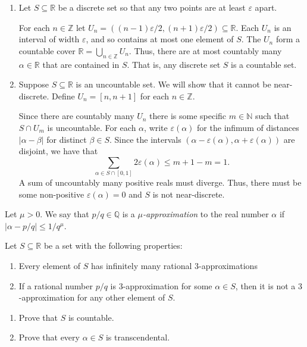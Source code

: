 \documentclass[12 pt, letterpaper]{hmcpset}
\begin{document}
\begin{solution}
	\begin{enumerate}
		\item Let $S \subseteq \mathbb{R}$ be a discrete set so that any two points are at least $\varepsilon$ apart.

			For each $n \in \mathbb{Z}$ let $U_{n} = ((n - 1) \varepsilon / 2, (n + 1) \varepsilon / 2) \subseteq \mathbb{R}$. Each $U_{n}$ is an interval of width $\varepsilon$, and so contains at most one element of $S$. The $U_{n}$ form a countable cover $\mathbb{R} = \bigcup_{n \in \mathbb{Z}} U_{n}$. Thus, there are at most countably many $\alpha \in \mathbb{R}$ that are contained in $S$. That is, any discrete set $S$ is a countable set.

		\item Suppose $S \subseteq \mathbb{R}$ is an uncountable set. We will show that it cannot be near-discrete. Define $U_{n} = [n, n + 1]$ for each $n \in \mathbb{Z}$.

			Since there are countably many $U_{n}$ there is some specific $m \in \mathbb{N}$ such that $S \cap U_{m}$ is uncountable. For each $\alpha$, write $\varepsilon(\alpha)$ for the infimum of distances $\lvert \alpha - \beta \rvert$ for distinct $\beta \in S$. Since the intervals $(\alpha - \varepsilon(\alpha), \alpha + \varepsilon(\alpha))$ are disjoint, we have that
			\[
				\sum_{\alpha \in S \cap [0, 1]} 2 \varepsilon(\alpha) \le m + 1 - m = 1.
			\]
			A sum of uncountably many positive reals must diverge. Thus, there must be some non-positive $\varepsilon(\alpha) = 0$ and $S$ is not near-discrete.
	\end{enumerate}
\end{solution}

\pagebreak

\begin{problem}[Problem 4.]
	Let $\mu > 0$. We say that $p / q \in \mathbb{Q}$ is a \emph{$\mu$-approximation} to the real number $\alpha$ if $\left \lvert \alpha - p/q \right \rvert \le 1 / q^{\mu}.$ 

	Let $S \subseteq \mathbb{R}$ be a set with the following properties:
	\begin{enumerate}[label = (\arabic*)]
		\item Every element of $S$ has infinitely many rational $3$-approximations
		\item If a rational number $p / q$ is $3$-approximation for some $\alpha \in S$, then it is not a $3$-approximation for any other element of $S$.
	\end{enumerate}

	\begin{enumerate}
		\item Prove that $S$ is countable.
		\item Prove that every $\alpha \in S$ is transcendental.
	\end{enumerate}
\end{problem}
\end{document}

